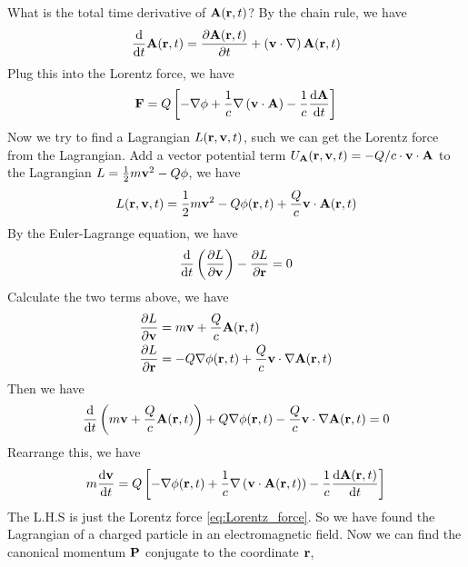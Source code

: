 What is the total time derivative of $\mathbf{A}(\mathbf{r},t)$? By the chain rule, we have
\begin{align}
    \frac{\mathrm{d}}{\mathrm{d} t}{\mathbf{A}(\mathbf{r},t)} = \frac{\partial \mathbf{A}(\mathbf{r},t)}{\partial t} + \left( \mathbf{v} \cdot \nabla \right) \mathbf{A}(\mathbf{r},t)
\end{align}
Plug this into the Lorentz force, we have
\begin{align}
    \mathbf{F} = Q \left[- \nabla \phi + \frac{1}{c} \nabla \left( \mathbf{v} \cdot \mathbf{A} \right) - \frac{1}{c} \frac{\mathrm{d} \mathbf{A}}{\mathrm{d} t} \right]
\end{align}
Now we try to find a Lagrangian $L(\mathbf{r},\mathbf{v},t)$, such we can get the Lorentz force from the Lagrangian. Add a vector potential term $U_{\mathbf{A}}(\mathbf{r},\mathbf{v},t) = - Q/c \cdot \mathbf{v} \cdot \mathbf{A}$ to the Lagrangian $L = \frac{1}{2} m \mathbf{v}^2 - Q \phi $, we have 
\begin{align}
    L(\mathbf{r},\mathbf{v},t) = \frac{1}{2} m \mathbf{v}^2 - Q \phi(\mathbf{r},t) + \frac{Q}{c} \mathbf{v} \cdot \mathbf{A}(\mathbf{r},t) \label{eq:lagrangian_em}
\end{align}
By the Euler-Lagrange equation, we have
\begin{align}
    \frac{\mathrm{d}}{\mathrm{d} t} \left( \frac{\partial L}{\partial \mathbf{v}} \right) - \frac{\partial L}{\partial \mathbf{r}} = 0
\end{align}
Calculate the two terms above, we have
\begin{align}
    \frac{\partial L}{\partial \mathbf{v}} &= m \mathbf{v} + \frac{Q}{c} \mathbf{A}(\mathbf{r},t) \\
    \frac{\partial L}{\partial \mathbf{r}} &= - Q \nabla \phi(\mathbf{r},t) + \frac{Q}{c} \mathbf{v} \cdot \nabla \mathbf{A}(\mathbf{r},t)
\end{align}
Then we have
\begin{align}
    \frac{\mathrm{d}}{\mathrm{d} t} \left( m \mathbf{v} + \frac{Q}{c} \mathbf{A}(\mathbf{r},t) \right) + Q \nabla \phi(\mathbf{r},t) - \frac{Q}{c} \mathbf{v} \cdot \nabla \mathbf{A}(\mathbf{r},t) = 0
\end{align}
Rearrange this, we have
\begin{align}
    m \frac{\mathrm{d} \mathbf{v}}{\mathrm{d} t} = Q \left[- \nabla \phi(\mathbf{r},t) + \frac{1}{c} \nabla \left( \mathbf{v} \cdot \mathbf{A}(\mathbf{r},t) \right) - \frac{1}{c} \frac{\mathrm{d} \mathbf{A}(\mathbf{r},t)}{\mathrm{d} t} \right]
\end{align}
The L.H.S is just the Lorentz force \cref{eq:Lorentz_force}. So we have found the Lagrangian of a charged particle in an electromagnetic field. Now we can find the canonical momentum $\mathbf{P}$ conjugate to the coordinate $\mathbf{r}$,
